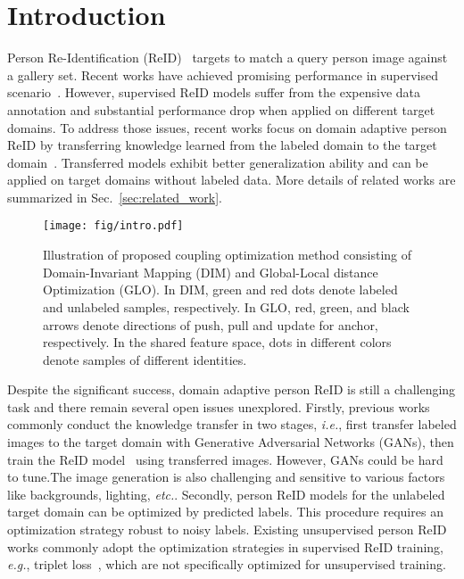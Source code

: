 \documentclass[sigconf]{acmart}
\begin{document}
\section{Introduction}
Person Re-Identification (ReID)~\cite{wei2018vp, li2019global, Chen_2019_ICCV_attention, zha2020adversarial, huang2020real, wang2020unsupervised, jianing_eccv_2020, zhong2020robust, li2020multi, liu2019self} targets to match a query person image against a gallery set. Recent works have achieved promising performance in supervised scenario~\cite{Chen_2019_ICCV_attention, zhang2017alignedreid, Guo_2019_ICCV, Liu_2019_ICCV, Zhang_2019_CVPR}. However, supervised ReID models suffer from the expensive data annotation and substantial performance drop when applied on different target domains. To address those issues, recent works focus on domain adaptive person ReID by transferring knowledge learned from the labeled domain to the target domain~\cite{yang2019patch, zhong2019invariance, yu2019unsupervised, Liu_2019_CVPR}. Transferred models exhibit better generalization ability and can be applied on target domains without labeled data. More details of related works are summarized in Sec.~\ref{sec:related_work}.

\begin{figure}[t]
\begin{center}
\texttt{[image: fig/intro.pdf]}
\end{center}
\vspace{-5mm}
\caption{Illustration of proposed coupling optimization method consisting of Domain-Invariant Mapping (DIM) and Global-Local distance Optimization (GLO). In DIM, green and red dots denote labeled and unlabeled samples, respectively. In GLO, red, green, and black arrows denote directions of push, pull and update for anchor, respectively. In the shared feature space, dots in different colors denote samples of different identities.}
\label{fig:intro}
\vspace{-4mm}
\end{figure}

Despite the significant success, domain adaptive person ReID is still a challenging task and there remain several open issues unexplored. Firstly, previous works commonly conduct the knowledge transfer in two stages, \emph{i.e.}, first transfer labeled images to the target domain with Generative Adversarial Networks (GANs), then train the ReID model~\cite{Chen_2019_ICCV, Liu_2019_CVPR, huang2019sbsgan, Li_2019_ICCV} using transferred images. However, GANs could be hard to tune.The image generation is also challenging and sensitive to various factors like backgrounds, lighting, \emph{etc.}. Secondly, person ReID models for the unlabeled target domain can be optimized by predicted labels. This procedure requires an optimization strategy robust to noisy labels. Existing unsupervised person ReID works commonly adopt the optimization strategies in supervised ReID training, \emph{e.g.}, triplet loss~\cite{yu2019unsupervised, zhong2018generalizing, ssg}, which are not specifically optimized for unsupervised training.
\end{document}
